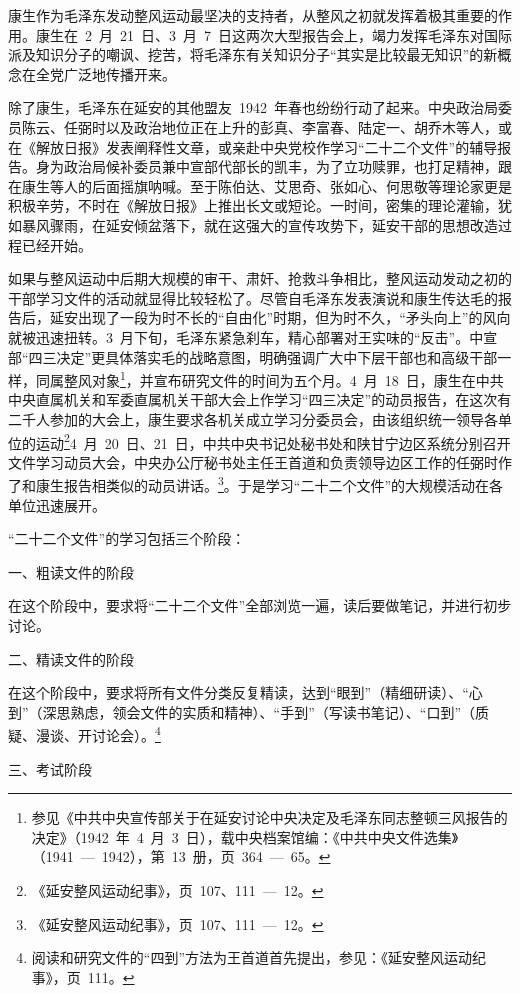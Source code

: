 康生作为毛泽东发动整风运动最坚决的支持者，从整风之初就发挥着极其重要的作用。康生在~2~月~21~日、3~月~7~日这两次大型报告会上，竭力发挥毛泽东对国际派及知识分子的嘲讽、挖苦，将毛泽东有关知识分子“其实是比较最无知识”的新概念在全党广泛地传播开来。

除了康生，毛泽东在延安的其他盟友~1942~年春也纷纷行动了起来。中央政治局委员陈云、任弼时以及政治地位正在上升的彭真、李富春、陆定一、胡乔木等人，或在《解放日报》发表阐释性文章，或亲赴中央党校作学习“二十二个文件”的辅导报告。身为政治局候补委员兼中宣部代部长的凯丰，为了立功赎罪，也打足精神，跟在康生等人的后面摇旗呐喊。至于陈伯达、艾思奇、张如心、何思敬等理论家更是积极辛劳，不时在《解放日报》上推出长文或短论。一时间，密集的理论灌输，犹如暴风骤雨，在延安倾盆落下，就在这强大的宣传攻势下，延安干部的思想改造过程已经开始。

如果与整风运动中后期大规模的审干、肃奸、抢救斗争相比，整风运动发动之初的干部学习文件的活动就显得比较轻松了。尽管自毛泽东发表演说和康生传达毛的报告后，延安出现了一段为时不长的“自由化”时期，但为时不久，“矛头向上”的风向就被迅速扭转。3~月下旬，毛泽东紧急刹车，精心部署对王实味的“反击”。中宣部“四三决定”更具体落实毛的战略意图，明确强调广大中下层干部也和高级干部一样，同属整风对象\footnote{参见《中共中央宣传部关于在延安讨论中央决定及毛泽东同志整顿三风报告的决定》（1942~年~4~月~3~日），载中央档案馆编：《中共中央文件选集》（1941~—~1942），第~13~册，页~364~—~65。}，并宣布研究文件的时间为五个月。4~月~18~日，康生在中共中央直属机关和军委直属机关干部大会上作学习“四三决定”的动员报告，在这次有二千人参加的大会上，康生要求各机关成立学习分委员会，由该组织统一领导各单位的运动\footnote{《延安整风运动纪事》，页~107、111~—~12。}4~月~20~日、21~日，中共中央书记处秘书处和陕甘宁边区系统分别召开文件学习动员大会，中央办公厅秘书处主任王首道和负责领导边区工作的任弼时作了和康生报告相类似的动员讲话。\footnote{《延安整风运动纪事》，页~107、111~—~12。}。于是学习“二十二个文件”的大规模活动在各单位迅速展开。

“二十二个文件”的学习包括三个阶段：

一、粗读文件的阶段

在这个阶段中，要求将“二十二个文件”全部浏览一遍，读后要做笔记，并进行初步讨论。

二、精读文件的阶段

在这个阶段中，要求将所有文件分类反复精读，达到“眼到”（精细研读）、“心到”（深思熟虑，领会文件的实质和精神）、“手到”（写读书笔记）、“口到”（质疑、漫谈、开讨论会）。\footnote{阅读和研究文件的“四到”方法为王首道首先提出，参见：《延安整风运动纪事》，页~111。}

三、考试阶段

